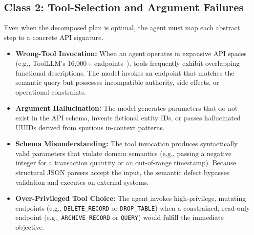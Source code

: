 \documentclass[conference]{IEEEtran}
\begin{document}
\subsection{Class 2: Tool-Selection and Argument Failures}
Even when the decomposed plan is optimal, the agent must map each abstract step to a concrete API signature.
\begin{itemize}
    \item \textbf{Wrong-Tool Invocation:} When an agent operates in expansive API spaces (e.g., ToolLLM's 16,000+ endpoints~\cite{qin2024toolllm}), tools frequently exhibit overlapping functional descriptions. The model invokes an endpoint that matches the semantic query but possesses incompatible authority, side effects, or operational constraints.
    \item \textbf{Argument Hallucination:} The model generates parameters that do not exist in the API schema, invents fictional entity IDs, or passes hallucinated UUIDs derived from spurious in-context patterns.
    \item \textbf{Schema Misunderstanding:} The tool invocation produces syntactically valid parameters that violate domain semantics (e.g., passing a negative integer for a transaction quantity or an out-of-range timestamp). Because structural JSON parsers accept the input, the semantic defect bypasses validation and executes on external systems.
    \item \textbf{Over-Privileged Tool Choice:} The agent invokes high-privilege, mutating endpoints (e.g., \texttt{DELETE\_RECORD} or \texttt{DROP\_TABLE}) when a constrained, read-only endpoint (e.g., \texttt{ARCHIVE\_RECORD} or \texttt{QUERY}) would fulfill the immediate objective.
\end{itemize}
\end{document}
